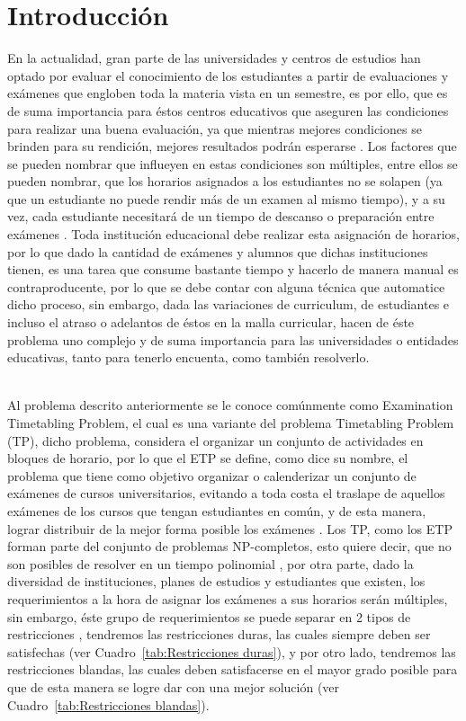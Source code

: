 \documentclass[letter, 10pt]{article}
\begin{document}
\section{Introducci\'on}
En la actualidad, gran parte de las universidades y centros de estudios han optado por evaluar el conocimiento de los estudiantes a partir de evaluaciones y exámenes que engloben toda la materia vista en un semestre, es por ello, que es de suma importancia para éstos centros educativos que aseguren las condiciones para realizar una buena evaluación, ya que mientras mejores condiciones se brinden para su rendición, mejores resultados podrán esperarse \cite{Cita1}. Los factores que se pueden nombrar que influeyen en estas condiciones son múltiples, entre ellos se pueden nombrar, que los horarios asignados a los estudiantes no se solapen (ya que un estudiante no puede rendir más de un examen al mismo tiempo), y a su vez, cada estudiante necesitará de un tiempo de descanso o preparación entre exámenes \cite{Cita2}. Toda institución educacional debe realizar esta asignación de horarios, por lo que dado la cantidad de exámenes y alumnos que dichas instituciones tienen, es una tarea que consume bastante tiempo y hacerlo de manera manual es contraproducente, por lo que se debe contar con alguna técnica que automatice dicho proceso, sin embargo, dada las variaciones de curriculum, de estudiantes e incluso el atraso o adelantos de éstos en la malla curricular, hacen de éste problema uno complejo y de suma importancia para las universidades o entidades educativas, tanto para tenerlo encuenta, como también resolverlo. 
\begin{itemize}
\end{itemize}
\\
Al problema descrito anteriormente se le conoce comúnmente como Examination Timetabling Problem, el cual es una variante del problema Timetabling Problem (TP), dicho problema, considera el organizar un conjunto de actividades en bloques de horario, por lo que el ETP se define, como dice su nombre, el problema que tiene como objetivo organizar o calenderizar un conjunto de exámenes de cursos universitarios, evitando a toda costa el traslape de aquellos exámenes de los cursos que tengan estudiantes en común, y de esta manera, lograr distribuir de la mejor forma posible los exámenes \cite{Cita3}. Los TP, como los ETP forman parte del conjunto de problemas NP-completos, esto quiere decir, que no son posibles de resolver en un tiempo polinomial \cite{Cita4}, por otra parte, dado la diversidad de instituciones, planes de estudios y estudiantes que existen, los requerimientos a la hora de asignar los exámenes a sus horarios serán múltiples, sin embargo, éste grupo de requerimientos se puede separar en 2 tipos de restricciones \cite{Cita5}, tendremos las restricciones duras, las cuales siempre deben ser satisfechas (ver Cuadro~\ref{tab:Restricciones duras}), y por otro lado, tendremos las restricciones blandas, las cuales deben satisfacerse en el mayor grado posible para que de esta manera se logre dar con una mejor solución (ver Cuadro~\ref{tab:Restricciones blandas}). 
\end{document}
